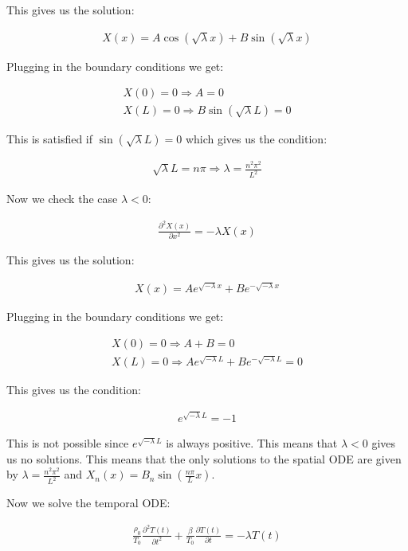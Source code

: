 \documentclass[a4paper]{article}
\begin{document}
This gives us the solution:

\begin{align*}
    X(x) = A \cos(\sqrt{\lambda}x) + B \sin(\sqrt{\lambda}x)
\end{align*}

Plugging in the boundary conditions we get:

\begin{align*}
    X(0) = 0 \Rightarrow A = 0 \\
    X(L) = 0 \Rightarrow B\sin(\sqrt{\lambda}L) = 0
\end{align*}

This is satisfied if $\sin(\sqrt{\lambda}L) = 0$ which gives us the condition:

\begin{align*}
    \sqrt{\lambda}L = n\pi \Rightarrow \lambda = \frac{n^2\pi^2}{L^2}
\end{align*}

Now we check the case $\lambda < 0$:

\begin{align*}
    \frac{\partial^2 X(x)}{\partial x^2} = -\lambda X(x)
\end{align*}

This gives us the solution:

\begin{align*}
    X(x) = A e^{\sqrt{-\lambda}x} + B e^{-\sqrt{-\lambda}x}
\end{align*}

Plugging in the boundary conditions we get:

\begin{align*}
    X(0) = 0 \Rightarrow A + B = 0 \\
    X(L) = 0 \Rightarrow A e^{\sqrt{-\lambda}L} + B e^{-\sqrt{-\lambda}L} = 0
\end{align*}

This gives us the condition:

\begin{align*}
    e^{\sqrt{-\lambda}L} = -1
\end{align*}

This is not possible since $e^{\sqrt{-\lambda}L}$ is always positive. This means that $\lambda < 0$ gives us no solutions.
This means that the only solutions to the spatial ODE are given by $\lambda = \frac{n^2\pi^2}{L^2}$ and $X_n(x) = B_n \sin(\frac{n\pi}{L}x)$.

Now we solve the temporal ODE:

\begin{align*}
    \frac{\rho_0}{T_0} \frac{\partial^2 T(t)}{\partial t^2} + \frac{\beta}{T_0} \frac{\partial T(t)}{\partial t} = -\lambda T(t)
\end{align*}
\end{document}
